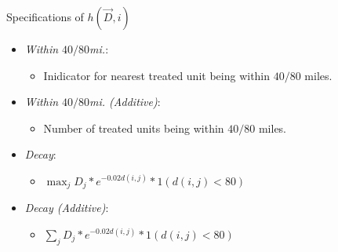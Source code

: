 \documentclass[aspectratio=169]{beamer}
\begin{document}
\begin{frame}{Specifications of $h(\vec{D}, i)$}
    
    \begin{itemize}
        \item \textit{Within $40/80$mi.}:
        \begin{itemize}
            \item Inidicator for nearest treated unit being within $40/80$ miles.
        \end{itemize}
        
        \item \textit{Within $40/80$mi. (Additive)}: 
        \begin{itemize}
            \item Number of treated units being within $40/80$ miles.
        \end{itemize}
        

        \item \textit{Decay}: 
        \begin{itemize}
            \item $\max_j D_j * e^{-0.02 d(i,j)} * 1(d(i,j) < 80)$
        \end{itemize}
        
        \item \textit{Decay (Additive)}: 
        \begin{itemize}
            \item $\sum_j D_j * e^{-0.02 d(i,j)} * 1(d(i,j) < 80)$
        \end{itemize}
        
    \end{itemize}

\end{frame}


\end{document}
